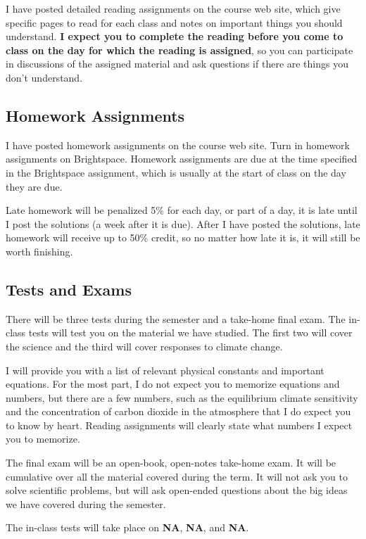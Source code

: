 \documentclass[11pt]{jgsyllabus}\usepackage[]{graphicx}\usepackage[]{xcolor}
\begin{document}
I have posted detailed reading assignments on the course web site, which give
specific pages to read for each class and notes on important things you should
understand.
\textbf{I expect you to complete the reading before you come to class on the day
for which the reading is assigned},
so you can participate in discussions of the
assigned material and ask questions if there are things you don't understand.

\subsection{Homework Assignments}

I have posted homework assignments on the course web site. Turn in homework
assignments on Brightspace. Homework assignments are due at the time specified
in the Brightspace assignment, which is usually at the start of class on the
day they are due.

Late homework will be penalized 5\% for each day, or part of a day, it is late
until I post the solutions (a week after it is due). After I have posted the
solutions, late homework will receive up to 50\% credit, so no matter how
late it is, it will still be worth finishing.


\subsection{Tests and Exams}

There will be three tests during the semester and a take-home final exam.
The in-class tests will test you on the material we have studied. The first
two will cover the science and the third will cover responses to climate change.

I will provide you with a list of relevant physical constants and important
equations. For the most part, I do not expect you to memorize equations and
numbers, but there are a few numbers, such as the equilibrium climate
sensitivity and the concentration of carbon dioxide in the atmosphere that
I do expect you to know by heart. Reading assignments will clearly state what
numbers I expect you to memorize.

The final exam will be an open-book, open-notes take-home exam.
It will be cumulative over all the material covered during the term.
It will not ask you to solve scientific problems, but will
ask open-ended questions about the big ideas we have covered during the semester.

The in-class tests will take place on
\textbf{NA},
\textbf{NA},
and
\textbf{NA}.
\end{document}
